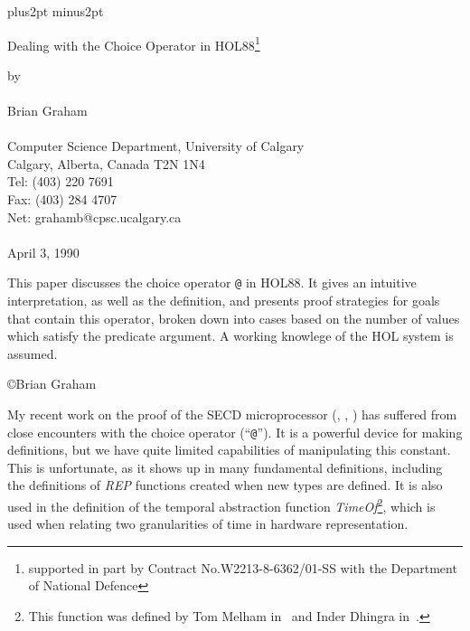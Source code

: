 \parskip=8pt plus2pt minus2pt




\newcommand{\ie}	{\mbox{\it i.e.}}
\newcommand{\inbox}[1]	{\begin{center}
			 \framebox{\parbox{0.984\textwidth}{#1}}
			 \end{center}}
\newcommand{\AND}	{\mbox{$\wedge$}}

{\LARGE
\begin{center} Dealing with the Choice Operator in 
HOL88\footnote{supported in part by Contract No.W2213-8-6362/01-SS
with the Department of National Defence}
\end{center}
}
\begin{center}
by\\
\ \ \\
Brian Graham\\
\ \ \\
Computer Science Department,
University of Calgary \\
Calgary, Alberta, Canada T2N 1N4 \\
Tel: (403) 220 7691 \\
Fax: (403) 284 4707 \\
Net: grahamb@cpsc.ucalgary.ca \\
\ \ \\
April 3, 1990 \\
\end{center}
\vfill
{\abstract This paper discusses the choice operator \verb+@+ in HOL88.
It gives an intuitive interpretation, as well as the definition, and
presents proof strategies for goals that contain this operator, broken
down into cases based on the number of values which satisfy the
predicate argument.  A working knowlege of the HOL system is assumed.}
\vfill
\vfill
\vfill
\vfill
\begin{center}
\copyright Brian Graham
\end{center}
\clearpage

My recent work on the proof of the SECD microprocessor
(\cite{Graham89c}, \cite{Simpson89c}, \cite{Birtwistle90a}) has
suffered from close encounters with the choice operator
(``\verb+@+'').  It is a powerful device for making definitions, but
we have quite limited capabilities of manipulating this constant.
This is unfortunate, as it shows up in many fundamental definitions,
including the definitions of {\it REP\/} functions created when new
types are defined.  It is also used in the definition of the temporal
abstraction function {\it TimeOf\/}\footnote{This function was defined
by Tom Melham in~\cite{Melham88a} and Inder Dhingra
in~\cite{Dhingra88b}.}, which is used when relating two granularities
of time in hardware representation.

